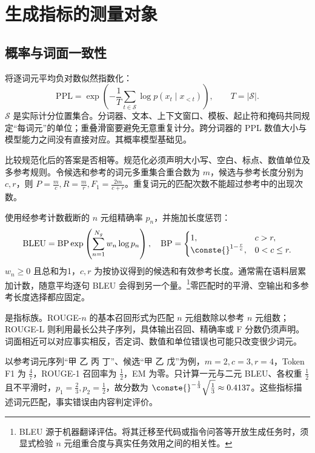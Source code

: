 \documentclass[../textbook.tex]{subfiles}
\begin{document}
\section{生成指标的测量对象}

\subsection{概率与词面一致性}


将逐词元平均负对数似然指数化：
\begin{equation}
 \mathrm{PPL}=\exp\left(-\frac1T\sum_{t\in\mathcal S}\log p(x_t\mid x_{<t})\right),\qquad T=|\mathcal S|.
\end{equation}
$\mathcal S$ 是实际计分位置集合。分词器、文本、上下文窗口、模板、起止符和掩码共同规定“每词元”的单位；重叠滑窗要避免无意重复计分。跨分词器的 PPL 数值大小与模型能力之间没有直接对应。其概率模型基础见。

比较规范化后的答案是否相等。规范化必须声明大小写、空白、标点、数值单位及多参考规则。令候选和参考的词元多重集合重合数为 $m$，候选与参考长度分别为 $c,r$，则 $P=\frac{m}{c},R=\frac{m}{r},F_1=\frac{2m}{c+r}$。重复词元的匹配次数不能超过参考中的出现次数。

使用经参考计数截断的 $n$ 元组精确率 $p_n$，并施加长度惩罚\cite{papineni2002bleu}：
\begin{equation}
 \mathrm{BLEU}=\mathrm{BP}\exp\left(\sum_{n=1}^{N_g}w_n\log p_n\right),\quad
 \mathrm{BP}=\begin{cases}1,&c>r,\\\conste{}^{1-\frac{r}{c}},&0<c\leq r.\end{cases}
\end{equation}
$w_n\geq0$ 且总和为1，$c,r$ 为按协议得到的候选和有效参考长度。通常需在语料层累加计数，随意平均逐句 BLEU 会得到另一个量。\footnote{BLEU 源于机器翻译评估。将其迁移至代码或指令问答等开放生成任务时，须显式检验 $n$ 元组重合度与真实任务效用之间的相关性。}零匹配时的平滑、空输出和多参考长度选择都应固定。

是指标族\cite{lin2004rouge}。ROUGE-$n$ 的基本召回形式为匹配 $n$ 元组数除以参考 $n$ 元组数；ROUGE-L 则利用最长公共子序列，具体输出召回、精确率或 F 分数仍须声明。词面相近可以对应事实相反，否定词、数值和单位错误也可能只改变很少词元。

\begin{example}[词面指标的手工计算]
以参考词元序列“甲 乙 丙 丁”、候选“甲 乙 戊”为例，$m=2,c=3,r=4$，Token F1 为 $\frac{4}{7}$，ROUGE-1 召回率为 $\frac{1}{2}$，EM 为零。只计算一元与二元 BLEU、各权重 $\frac{1}{2}$ 且不平滑时，$p_1=\frac{2}{3},p_2=\frac{1}{2}$，故分数为 $\conste{}^{-\frac{1}{3}}\sqrt{\frac{1}{3}}\approx0.4137$。这些指标描述词元匹配，事实错误由内容判定评价。
\end{example}
\end{document}

